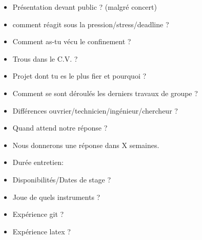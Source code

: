 \documentclass[12pt, a4paper]{article}
\begin{document}
\begin{itemize}
\item Présentation devant public ? (malgré concert)
\item comment réagit sous la pression/stress/deadline ?
\item Comment as-tu vécu le confinement ?
\item Trous dans le C.V. ?
\item Projet dont tu es le plus fier et pourquoi ?
\item Comment se sont déroulés les derniers travaux de groupe ?
\item Différences ouvrier/technicien/ingénieur/chercheur ?
\item Quand attend notre réponse ?
\item Nous donnerons une réponse dans X semaines.
\item Durée entretien:
\item Disponibilités/Dates de stage ?
\item Joue de quels instruments ?
\item Expérience git ?
\item Expérience latex ?
\end{itemize}
\end{document}
